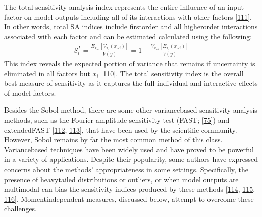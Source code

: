 \documentclass[letterpaper,10pt,english]{sphinxmanual}
\begin{document}
\sphinxAtStartPar
The total sensitivity analysis index represents the entire influence of an input factor on model outputs including all of its interactions with other factors {[}\hyperlink{cite.index:id150}{111}{]}. In other words, total SA indices include first\sphinxhyphen{}order and all higher\sphinxhyphen{}order interactions associated with each factor and can be estimated calculated using the following:
\begin{equation*}
\begin{split}S_i^T= \frac{E_{x_{\sim i}}[V_{x_i}(x_{\sim i})]}{V(y)} = 1 - \frac{V_{x_{\sim i}}[E_{x_{i}}(x_{\sim i})]}{V(y)}\end{split}
\end{equation*}
\sphinxAtStartPar
This index reveals the expected portion of variance that remains if uncertainty is eliminated in all factors but \(x_i\) {[}\hyperlink{cite.index:id149}{110}{]}. The total sensitivity index is the overall best measure of sensitivity as it captures the full individual and interactive effects of model factors.

\sphinxAtStartPar
Besides the Sobol method, there are some other variance\sphinxhyphen{}based sensitivity analysis methods, such as the Fourier amplitude sensitivity test (FAST; {[}\hyperlink{cite.index:id100}{75}{]}) and extended\sphinxhyphen{}FAST {[}\hyperlink{cite.index:id152}{112}, \hyperlink{cite.index:id153}{113}{]}, that have been used by the scientific community. However, Sobol remains by far the most common method of this class. Variance\sphinxhyphen{}based techniques have been widely used and have proved to be powerful in a variety of applications. Despite their popularity, some authors have expressed concerns about the methods’ appropriateness in some settings. Specifically, the presence of heavy\sphinxhyphen{}tailed distributions or outliers, or when model outputs are multimodal can bias the sensitivity indices produced by these methods {[}\hyperlink{cite.index:id154}{114}, \hyperlink{cite.index:id155}{115}, \hyperlink{cite.index:id156}{116}{]}. Moment\sphinxhyphen{}independent measures, discussed below, attempt to overcome these challenges.
\end{document}

